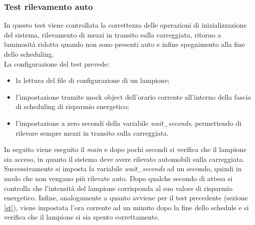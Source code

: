 \subsubsection{Test rilevamento auto}
In questo test viene controllata la correttezza delle operazioni di inizializzazione del sistema, rilevamento di mezzi in transito sulla carreggiata, ritorno a luminosità ridotta quando non sono presenti auto e infine spegnimento alla fine dello scheduling.
\\La configurazione del test prevede:
\begin{itemize}
	\item la lettura del file di configurazione di un lampione;
	\item l'impostazione tramite mock object dell'orario corrente all'interno della fascia di scheduling di risparmio energetico;
	\item l'impostazione a zero secondi della variabile \textit{wait\_seconds}, permettendo di rilevare sempre mezzi in transito sulla carreggiata.
\end{itemize}
In seguito viene eseguito il \textit{main} e dopo pochi secondi si verifica che il lampione sia acceso, in quanto il sistema deve avere rilevato automobili sulla carreggiata.
Successivamente si imposta la variabile \textit{wait\_seconds} ad un secondo, quindi in modo che non vengano più rilevate auto.
Dopo qualche secondo di attesa si controlla che l'intensità del lampione corrisponda al suo valore di risparmio energetico.
Infine, analogamente a quanto avviene per il test precedente (sezione \ref{st}), viene impostata l'ora corrente ad un minuto dopo la fine dello schedule e si verifica che il lampione si sia spento correttamente.


